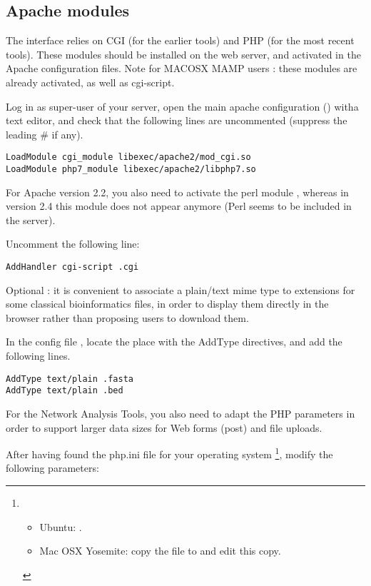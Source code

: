 \documentclass[12pt,a4paper, twoside]{scrreprt} %
\begin{document}
\subsection{Apache modules}

The \RSAT interface relies on CGI (for the earlier tools) and PHP (for
the most recent tools). These modules should be installed on the web
server, and activated in the Apache configuration files. Note for MACOSX MAMP users : these modules are already activated, as well as cgi-script.

Log in as super-user of your server, open the main apache
configuration () witha text editor, and
check that the following lines are uncommented (suppress the leading
\# if any).

\begin{lstlisting}
LoadModule cgi_module libexec/apache2/mod_cgi.so
LoadModule php7_module libexec/apache2/libphp7.so
\end{lstlisting}
                                                        
For Apache version 2.2, you also need to activate the perl module
, whereas in version 2.4 this module does not
appear anymore (Perl seems to be included in the server).

Uncomment the following line:

\begin{lstlisting}
AddHandler cgi-script .cgi
\end{lstlisting}

Optional : it is convenient to associate a plain/text mime type to
extensions for some classical bioinformatics files, in order to
display them directly in the browser rather than proposing users to
download them.

In the config file , locate the place with the AddType
directives, and add the following lines.

\begin{lstlisting}
AddType text/plain .fasta
AddType text/plain .bed
\end{lstlisting}

For the Network Analysis Tools, you also need to adapt the PHP
parameters in order to support larger data sizes for Web forms (post)
and file uploads.


After having found the php.ini file for your operating
system \footnote{
  \begin{itemize}
  \item Ubuntu:  .
  \item Mac OSX Yosemite: copy the file  to
     and edit this copy.
  \end{itemize}
}, modify the following parameters:
\end{document}
